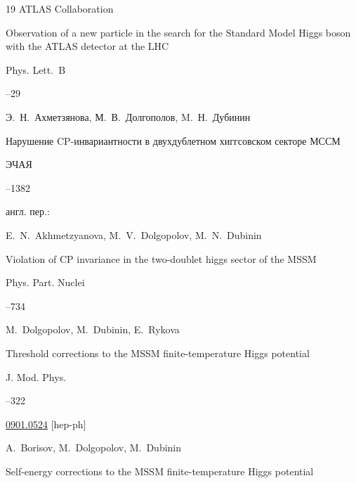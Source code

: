 \begin{thebibliography}{19}
\by ATLAS Collaboration

\paper 	Observation of a new particle in the search for the Standard Model Higgs boson with the ATLAS detector at the LHC

\jour Phys. Lett.~B




--29




\by  Э.~Н.~Ахметзянова, М.~В.~Долгополов, M.~Н.~Дубинин

\paper Нарушение CP-ин\-ва\-риант\-ности в двухдублетном хиггсовском секторе МССМ

\jour ЭЧАЯ




–1382

\transl англ. пер.:~

\by  E.~N.~Akhmetzyanova, M.~V.~Dolgopolov, M.~N.~Dubinin

\paper Viola\-tion of CP invariance in the two-doublet higgs sector of the MSSM

\jour  Phys. Part. Nuclei




–734




\by M.~Dolgopolov, M.~Dubinin, E.~Rykova

\paper Threshold corrections to the MSSM finite-tempe\-ra\-ture Higgs potential

\jour J. Mod. Phys.



–322

\arxiv \href{http://arxiv-web.arxiv.org/abs/0901.0524}{0901.0524} [hep-ph]





\by A.~Borisov, M.~Dolgopolov, M.~Dubinin 

\eprint Self-energy corrections to the MSSM finite-tempe\-ra\-ture Higgs potential


\end{thebibliography}
